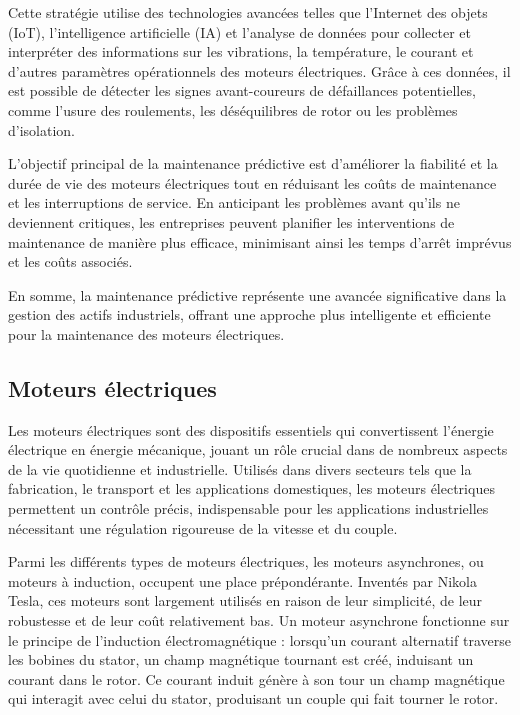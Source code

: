 Cette stratégie utilise des technologies avancées telles que l'Internet des
objets (IoT), l'intelligence artificielle (IA) et l'analyse de données pour
collecter et interpréter des informations sur les vibrations, la température,
le courant et d'autres paramètres opérationnels des moteurs électriques. Grâce
à ces données, il est possible de détecter les signes avant-coureurs de
défaillances potentielles, comme l'usure des roulements, les déséquilibres de
rotor ou les problèmes d'isolation.

L'objectif principal de la maintenance prédictive est d'améliorer la fiabilité
et la durée de vie des moteurs électriques tout en réduisant les coûts de
maintenance et les interruptions de service. En anticipant les problèmes avant
qu'ils ne deviennent critiques, les entreprises peuvent planifier les
interventions de maintenance de manière plus efficace, minimisant ainsi les
temps d'arrêt imprévus et les coûts associés.

En somme, la maintenance prédictive représente une avancée significative dans
la gestion des actifs industriels, offrant une approche plus intelligente et
efficiente pour la maintenance des moteurs électriques.

\subsection{Moteurs électriques}

Les moteurs électriques sont des dispositifs essentiels qui convertissent
l'énergie électrique en énergie mécanique, jouant un rôle crucial dans de
nombreux aspects de la vie quotidienne et industrielle. Utilisés dans divers
secteurs tels que la fabrication, le transport et les applications domestiques,
les moteurs électriques permettent un contrôle précis, indispensable pour les
applications industrielles nécessitant une régulation rigoureuse de la vitesse
et du couple.

Parmi les différents types de moteurs électriques, les moteurs asynchrones, ou
moteurs à induction, occupent une place prépondérante. Inventés par Nikola
Tesla, ces moteurs sont largement utilisés en raison de leur simplicité, de
leur robustesse et de leur coût relativement bas. Un moteur asynchrone
fonctionne sur le principe de l'induction électromagnétique : lorsqu'un courant
alternatif traverse les bobines du stator, un champ magnétique tournant est
créé, induisant un courant dans le rotor. Ce courant induit génère à son tour
un champ magnétique qui interagit avec celui du stator, produisant un couple
qui fait tourner le rotor.

